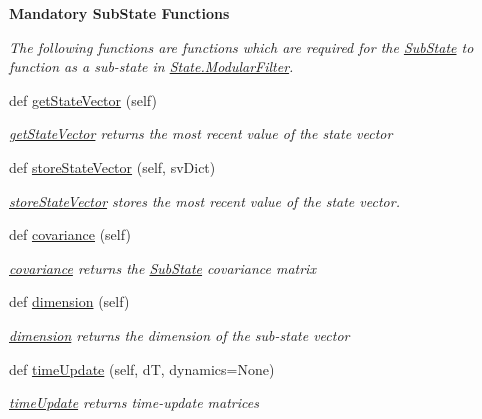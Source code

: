\begin{Indent}{\bf Mandatory Sub\+State Functions}\par
{\em The following functions are functions which are required for the \hyperlink{classSubStates_1_1SubState}{Sub\+State} to function as a sub-\/state in \hyperlink{classState_1_1ModularFilter}{State.\+Modular\+Filter}. }\begin{DoxyCompactItemize}
\item 
def \hyperlink{classSubStates_1_1SubState_a3ebd1a120f63ed477ee76999518a8828}{get\+State\+Vector} (self)
\begin{DoxyCompactList}\small\item\em \hyperlink{classSubStates_1_1SubState_a3ebd1a120f63ed477ee76999518a8828}{get\+State\+Vector} returns the most recent value of the state vector \end{DoxyCompactList}\item 
def \hyperlink{classSubStates_1_1SubState_a65edbf44c6d93049cf0b2cb8e4b18b99}{store\+State\+Vector} (self, sv\+Dict)
\begin{DoxyCompactList}\small\item\em \hyperlink{classSubStates_1_1SubState_a65edbf44c6d93049cf0b2cb8e4b18b99}{store\+State\+Vector} stores the most recent value of the state vector. \end{DoxyCompactList}\item 
def \hyperlink{classSubStates_1_1SubState_a4d863939fdb98b2739e1e737ec7496ae}{covariance} (self)
\begin{DoxyCompactList}\small\item\em \hyperlink{classSubStates_1_1SubState_a4d863939fdb98b2739e1e737ec7496ae}{covariance} returns the \hyperlink{classSubStates_1_1SubState}{Sub\+State} covariance matrix \end{DoxyCompactList}\item 
def \hyperlink{classSubStates_1_1SubState_a4aebea19a134cb871a7c0b6c2709546a}{dimension} (self)
\begin{DoxyCompactList}\small\item\em \hyperlink{classSubStates_1_1SubState_a4aebea19a134cb871a7c0b6c2709546a}{dimension} returns the dimension of the sub-\/state vector \end{DoxyCompactList}\item 
def \hyperlink{classSubStates_1_1SubState_af07ac4d1435fdecff97cff84bae4eeab}{time\+Update} (self, dT, dynamics=None)
\begin{DoxyCompactList}\small\item\em \hyperlink{classSubStates_1_1SubState_af07ac4d1435fdecff97cff84bae4eeab}{time\+Update} returns time-\/update matrices \end{DoxyCompactList}\item 

\end{DoxyCompactItemize}
\end{Indent}
